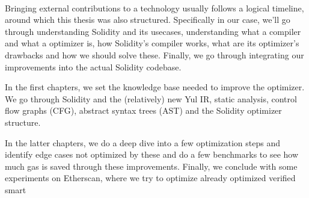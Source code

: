 \paragraph*{}
Bringing external contributions to a technology usually follows a logical timeline, around which this thesis was also structured. Specifically in our case, we'll go through understanding Solidity and its usecases, understanding what a compiler and what a optimizer is, how Solidity's compiler works, what are its optimizer's drawbacks and how we should solve these. Finally, we go through integrating our improvements into the actual Solidity codebase.

In the first chapters, we set the knowledge base needed to improve the optimizer. We go through Solidity and the (relatively) new Yul IR, static analysis, control flow graphs (CFG), abstract syntax trees (AST) and the Solidity optimizer structure.

In the latter chapters, we do a deep dive into a few optimization steps and identify edge cases not optimized by these and do a few benchmarks to see how much gas is saved through these improvements. Finally, we conclude with some experiments on Etherscan, where we try to optimize already optimized verified smart
